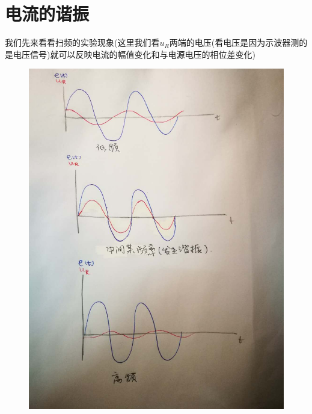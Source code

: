 \documentclass[12pt]{book}
\theoremstyle{definition}\newtheorem{dfn}{Définition}[chapter]
\theoremstyle{plain}\newtheorem{thm}{Théorème}[chapter]
\theoremstyle{plain}\newtheorem{prp}{Proposition}[chapter]
\theoremstyle{plain}\newtheorem{lem}{\bf Lemme}[chapter]
\theoremstyle{plain}\newtheorem{axm}{\bf Axiome}[chapter]
\theoremstyle{plain}\newtheorem{lmm}{\bf Lemme}[chapter]
\theoremstyle{plain}\newtheorem{cor}{\bf Corollaire}[chapter]
\theoremstyle{remark}\newtheorem{rem}{Remarque}[chapter]
\begin{document}
\section{电流的谐振}
我们先来看看扫频的实验现象(这里我们看$u_R$两端的电压(看电压是因为示波器测的是电压信号)就可以反映电流的幅值变化和与电源电压的相位差变化)
\begin{figure}[H]
	\centering
	\includegraphics[scale=0.1]{image//Etude du circuit RLC serie-Resonances//2}
\end{figure}
\end{document}
